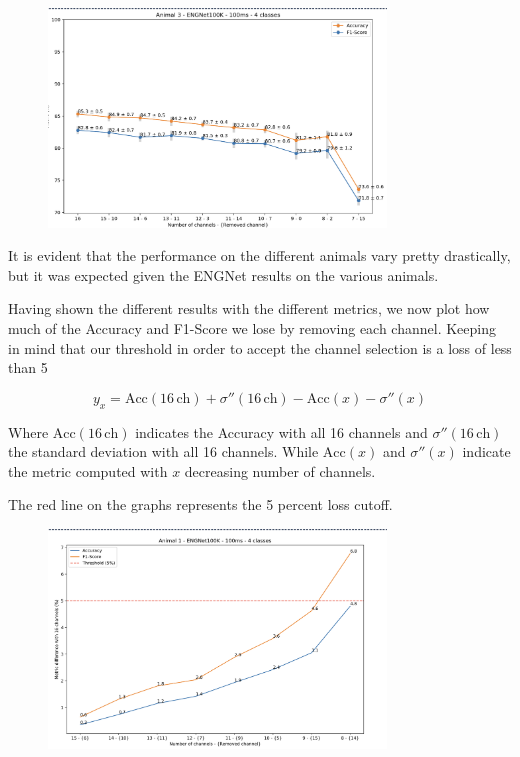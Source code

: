 \documentclass{Configuration_Files/PoliMi3i_thesis}
\begin{document}
\begin{figure}[H]
    \centering
    \includegraphics[width=0.8\textwidth]{Results Matteo/figure4}
    \label{fig:figure1}
\end{figure}

It is evident that the performance on the different animals vary pretty drastically, but it was expected given the ENGNet results on the various animals.

Having shown the different results with the different metrics, we now plot how much of the Accuracy and F1-Score we lose by removing each channel.
Keeping in mind that our threshold in order to accept the channel selection is a loss of less than 5%

\[
y_x = \text{Acc}(16 \, \text{ch}) + \sigma''(16 \, \text{ch}) - \text{Acc}(x) - \sigma''(x)
\]

Where $\text{Acc}(16 \, \text{ch})$ indicates the Accuracy with all 16 channels and $\sigma''(16 \, \text{ch})$ the standard deviation with all 16 channels.
While $\text{Acc}(x)$ and $\sigma''(x)$ indicate the metric computed with $x$ decreasing number of channels.

The red line on the graphs represents the 5 percent loss cutoff.

\begin{figure}[H]
    \centering
    \includegraphics[width=0.8\textwidth]{Results Matteo/figure6}
    \label{fig:figure1}
\end{figure}
\end{document}
